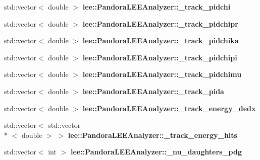 \begin{DoxyCompactItemize}
\item 
\hypertarget{group__lee_gad41a5c8f9908d57ca71dafdd1acffa77}{std\-::vector$<$ double $>$ {\bfseries lee\-::\-Pandora\-L\-E\-E\-Analyzer\-::\-\_\-track\-\_\-pidchi}}\label{group__lee_gad41a5c8f9908d57ca71dafdd1acffa77}

\item 
\hypertarget{group__lee_gaecf90a4b535a1eea4a2e46efaed73aee}{std\-::vector$<$ double $>$ {\bfseries lee\-::\-Pandora\-L\-E\-E\-Analyzer\-::\-\_\-track\-\_\-pidchipr}}\label{group__lee_gaecf90a4b535a1eea4a2e46efaed73aee}

\item 
\hypertarget{group__lee_gacd3a6086b23d0242a02a1aaafaa22f21}{std\-::vector$<$ double $>$ {\bfseries lee\-::\-Pandora\-L\-E\-E\-Analyzer\-::\-\_\-track\-\_\-pidchika}}\label{group__lee_gacd3a6086b23d0242a02a1aaafaa22f21}

\item 
\hypertarget{group__lee_gaecc3128a6d2e1ce777b2a47cf8d8592e}{std\-::vector$<$ double $>$ {\bfseries lee\-::\-Pandora\-L\-E\-E\-Analyzer\-::\-\_\-track\-\_\-pidchipi}}\label{group__lee_gaecc3128a6d2e1ce777b2a47cf8d8592e}

\item 
\hypertarget{group__lee_ga92b6e7aa446dda4b3fb5ef6a523417d3}{std\-::vector$<$ double $>$ {\bfseries lee\-::\-Pandora\-L\-E\-E\-Analyzer\-::\-\_\-track\-\_\-pidchimu}}\label{group__lee_ga92b6e7aa446dda4b3fb5ef6a523417d3}

\item 
\hypertarget{group__lee_ga51862c538bdadd1819aa4cc47f37daab}{std\-::vector$<$ double $>$ {\bfseries lee\-::\-Pandora\-L\-E\-E\-Analyzer\-::\-\_\-track\-\_\-pida}}\label{group__lee_ga51862c538bdadd1819aa4cc47f37daab}

\item 
\hypertarget{group__lee_ga548f84dc28b54f42d917780967237fbb}{std\-::vector$<$ double $>$ {\bfseries lee\-::\-Pandora\-L\-E\-E\-Analyzer\-::\-\_\-track\-\_\-energy\-\_\-dedx}}\label{group__lee_ga548f84dc28b54f42d917780967237fbb}

\item 
\hypertarget{group__lee_ga78b31424830aa3c041dbff599185c3bb}{std\-::vector$<$ std\-::vector\\*
$<$ double $>$ $>$ {\bfseries lee\-::\-Pandora\-L\-E\-E\-Analyzer\-::\-\_\-track\-\_\-energy\-\_\-hits}}\label{group__lee_ga78b31424830aa3c041dbff599185c3bb}

\item 
\hypertarget{group__lee_gaaacddd2332477a23f786ee4c854d3e61}{std\-::vector$<$ int $>$ {\bfseries lee\-::\-Pandora\-L\-E\-E\-Analyzer\-::\-\_\-nu\-\_\-daughters\-\_\-pdg}}\label{group__lee_gaaacddd2332477a23f786ee4c854d3e61}


\end{DoxyCompactItemize}
